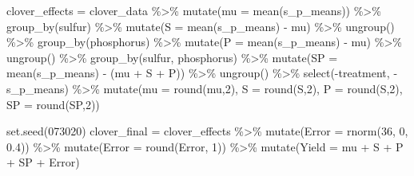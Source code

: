 \documentclass[
]{book}
\newenvironment{Shaded}{\begin{snugshade}}{\end{snugshade}}
\newcommand{\AttributeTok}[1]{\textcolor[rgb]{0.77,0.63,0.00}{#1}}
\newcommand{\DecValTok}[1]{\textcolor[rgb]{0.00,0.00,0.81}{#1}}
\newcommand{\FloatTok}[1]{\textcolor[rgb]{0.00,0.00,0.81}{#1}}
\newcommand{\FunctionTok}[1]{\textcolor[rgb]{0.00,0.00,0.00}{#1}}
\newcommand{\NormalTok}[1]{#1}
\newcommand{\OtherTok}[1]{\textcolor[rgb]{0.56,0.35,0.01}{#1}}
\newcommand{\SpecialCharTok}[1]{\textcolor[rgb]{0.00,0.00,0.00}{#1}}
\begin{document}
\begin{Shaded}
\begin{Highlighting}[]
\NormalTok{clover\_effects }\OtherTok{=}\NormalTok{ clover\_data }\SpecialCharTok{\%\textgreater{}\%}
  \FunctionTok{mutate}\NormalTok{(}\AttributeTok{mu =} \FunctionTok{mean}\NormalTok{(s\_p\_means)) }\SpecialCharTok{\%\textgreater{}\%}
  \FunctionTok{group\_by}\NormalTok{(sulfur) }\SpecialCharTok{\%\textgreater{}\%}
  \FunctionTok{mutate}\NormalTok{(}\AttributeTok{S =} \FunctionTok{mean}\NormalTok{(s\_p\_means) }\SpecialCharTok{{-}}\NormalTok{ mu) }\SpecialCharTok{\%\textgreater{}\%}
  \FunctionTok{ungroup}\NormalTok{() }\SpecialCharTok{\%\textgreater{}\%}
  \FunctionTok{group\_by}\NormalTok{(phosphorus) }\SpecialCharTok{\%\textgreater{}\%}
  \FunctionTok{mutate}\NormalTok{(}\AttributeTok{P =} \FunctionTok{mean}\NormalTok{(s\_p\_means) }\SpecialCharTok{{-}}\NormalTok{ mu) }\SpecialCharTok{\%\textgreater{}\%}
  \FunctionTok{ungroup}\NormalTok{() }\SpecialCharTok{\%\textgreater{}\%}
  \FunctionTok{group\_by}\NormalTok{(sulfur, phosphorus) }\SpecialCharTok{\%\textgreater{}\%}
  \FunctionTok{mutate}\NormalTok{(}\AttributeTok{SP =} \FunctionTok{mean}\NormalTok{(s\_p\_means) }\SpecialCharTok{{-}}\NormalTok{ (mu }\SpecialCharTok{+}\NormalTok{ S }\SpecialCharTok{+}\NormalTok{ P)) }\SpecialCharTok{\%\textgreater{}\%}
  \FunctionTok{ungroup}\NormalTok{() }\SpecialCharTok{\%\textgreater{}\%}
  \FunctionTok{select}\NormalTok{(}\SpecialCharTok{{-}}\NormalTok{treatment, }\SpecialCharTok{{-}}\NormalTok{s\_p\_means) }\SpecialCharTok{\%\textgreater{}\%}
  \FunctionTok{mutate}\NormalTok{(}\AttributeTok{mu =} \FunctionTok{round}\NormalTok{(mu,}\DecValTok{2}\NormalTok{),}
         \AttributeTok{S =} \FunctionTok{round}\NormalTok{(S,}\DecValTok{2}\NormalTok{),}
         \AttributeTok{P =} \FunctionTok{round}\NormalTok{(S,}\DecValTok{2}\NormalTok{),}
         \AttributeTok{SP =} \FunctionTok{round}\NormalTok{(SP,}\DecValTok{2}\NormalTok{))}


\FunctionTok{set.seed}\NormalTok{(}\DecValTok{073020}\NormalTok{)}
\NormalTok{clover\_final }\OtherTok{=}\NormalTok{ clover\_effects }\SpecialCharTok{\%\textgreater{}\%}
  \FunctionTok{mutate}\NormalTok{(}\AttributeTok{Error =} \FunctionTok{rnorm}\NormalTok{(}\DecValTok{36}\NormalTok{, }\DecValTok{0}\NormalTok{, }\FloatTok{0.4}\NormalTok{)) }\SpecialCharTok{\%\textgreater{}\%}
  \FunctionTok{mutate}\NormalTok{(}\AttributeTok{Error =} \FunctionTok{round}\NormalTok{(Error, }\DecValTok{1}\NormalTok{)) }\SpecialCharTok{\%\textgreater{}\%}
  \FunctionTok{mutate}\NormalTok{(}\AttributeTok{Yield =}\NormalTok{ mu }\SpecialCharTok{+}\NormalTok{ S }\SpecialCharTok{+}\NormalTok{ P }\SpecialCharTok{+}\NormalTok{ SP }\SpecialCharTok{+}\NormalTok{ Error) }
\end{Highlighting}
\end{Shaded}
\end{document}
